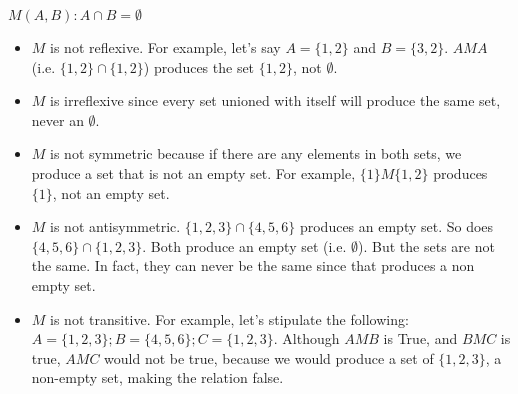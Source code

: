 \documentclass{article}
\begin{document}
$M(A,B): A \cap B = \emptyset$

\begin{comment}
What does this mean in English?

Okay, I almost screwed up this entire problem, thinking that we are trying to prove that we produce a non-empty set, when in reality, we are trying to produce an empty set.

Like the previous problem, let's work through each of the properties, one at a time.

I'm double screwed. I think we are stipulating that that the relation will always produce an empty set.

So the question now is, what examples can we provide where $A \cap B$ does not produce an empty set (i.e. $\emptyset$)

How do we tell if it's symmetric. We need to have all elements in A to be present in the set B.

\end{comment}

\begin{itemize}
    \item $M$ is not reflexive. For example, let's say $A = \{1,2\}$ and $B = \{3,2\}$.  $A M A$ (i.e. $\{1,2\} \cap \{1,2\}$) produces the set $\{1,2\}$, not $\emptyset$.
    \item $M$ is irreflexive since every set unioned with itself will produce the same set, never an $\emptyset$.
    \item $M$ is not symmetric because if there are any elements in both sets, we produce a set that is not an empty set. For example, $\{1\}M\{1,2\}$ produces $\{1\}$, not an empty set.
    \item $M$ is not antisymmetric. $\{1,2,3\} \cap \{4,5,6\}$ produces an empty set. So does $\{4,5,6\} \cap \{1,2,3\}$. Both produce an empty set (i.e. $\emptyset$). But the sets are not the same. In fact, they can never be the same since that produces a non empty set.
    \item $M$ is not transitive. For example, let's stipulate the following: $A = \{1,2,3\}; B = \{4,5,6\}; C= \{1,2,3\}$. Although $A M B$ is True, and $B M C$ is true, $A M C$ would not be true, because we would produce a set of $\{1,2,3\}$, a non-empty set, making the relation false.
\end{itemize}

\section{}
\end{document}
